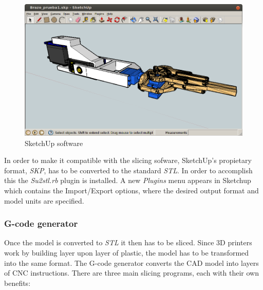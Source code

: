 			\begin{figure}[H]
				\centering
				\includegraphics[scale=0.4]{images/ProjectComponents/sketchup-arm.png}
				\caption{SketchUp software}
				\label{sketchup}
			\end{figure}
			\bigskip

		In order to make it compatible with the slicing sofware, SketchUp's propietary format, \textit{SKP}, has to be converted to the standard \textit{STL}. In order to accomplish this the \textit{Su2stl.rb} plugin is installed. A new \textit{Plugins} menu appears in Sketchup which contains the Import/Export options, where the desired output format and model units are specified.



		\subsubsection{G-code generator} 
		Once the model is converted to \textit{STL} it then has to be sliced. Since 3D printers work by building layer upon layer of plastic, the model has to be transformed into the same format. The G-code generator converts the CAD model into layers of CNC instructions. There are three main slicing programs, each with their own benefits:


